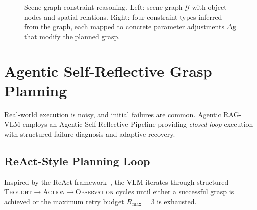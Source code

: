\documentclass[letterpaper, 10pt, conference]{ieeeconf}
\newcommand{\sysname}{Agentic RAG-VLM}
\begin{document}
\begin{figure}[b]
{
    }
    \caption{Scene graph constraint reasoning. Left: scene graph $\mathcal{G}$ with object nodes and spatial relations. Right: four constraint types inferred from the graph, each mapped to concrete parameter adjustments $\Delta\mathbf{g}$ that modify the planned grasp.}
    \label{fig:scene_graph}
\end{figure}

\section{Agentic Self-Reflective Grasp Planning}
\label{sec:agentic}

Real-world execution is noisy, and initial failures are common.
\sysname{} employs an Agentic Self-Reflective Pipeline providing \emph{closed-loop} execution with structured failure diagnosis and adaptive recovery.

\subsection{ReAct-Style Planning Loop}
\label{sec:react}

Inspired by the ReAct framework~\cite{yao2023react}, the VLM iterates through structured \textsc{Thought}$\rightarrow$\textsc{Action}$\rightarrow$\textsc{Observation} cycles until either a successful grasp is achieved or the maximum retry budget $R_{\max} = 3$ is exhausted.
\end{document}
